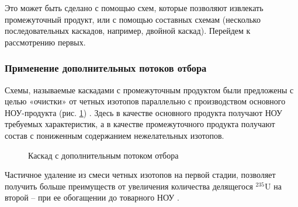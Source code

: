 Это может быть сделано с помощью схем, которые позволяют извлекать промежуточный продукт, или с помощью составных схемам (несколько последовательных каскадов, например, двойной каскад).
Перейдем к рассмотрению первых.

\subsubsection{Применение дополнительных потоков отбора}
Схемы, называемые каскадами с промежуточным продуктом были предложены с целью «очистки» от четных изотопов параллельно с производством основного НОУ-продукта (рис. \ref{fig:3_out}) \cite{zhurinSPOSOBPERERABOTKIZAGRYaZNENNOGO, palkinAnaliticheskiyRaschetSoderzhaniya2007}.
Здесь в качестве основного продукта получают НОУ требуемых характеристик, а в качестве промежуточного продукта получают состав с пониженным содержанием нежелательных изотопов.
\begin{figure}[ht]
  \caption{Каскад с дополнительным потоком отбора}\label{fig:3_out}
\end{figure}

Частичное удаление из смеси четных изотопов на первой стадии, позволяет получить больше преимуществ от увеличения количества делящегося $^{235}$U на второй -- при ее обогащении до товарного НОУ \cite{palkinSeparationUraniumIsotopes2010}.

